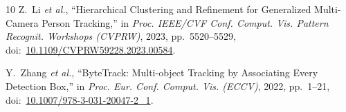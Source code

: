 \documentclass[journal,letterpaper]{IEEEtran}
\begin{document}
\begin{thebibliography}{10}
Z.~Li \emph{et al.},
``Hierarchical Clustering and Refinement for Generalized Multi-Camera Person Tracking,''
in \emph{Proc. IEEE/CVF Conf. Comput. Vis. Pattern Recognit. Workshops (CVPRW)},
2023, pp.~5520--5529,
doi:~\url{10.1109/CVPRW59228.2023.00584}.

Y.~Zhang \emph{et al.},
``ByteTrack: Multi-object Tracking by Associating Every Detection Box,''
in \emph{Proc. Eur. Conf. Comput. Vis. (ECCV)},
2022, pp.~1--21,
doi:~\url{10.1007/978-3-031-20047-2_1}.
\end{thebibliography}
\end{document}
